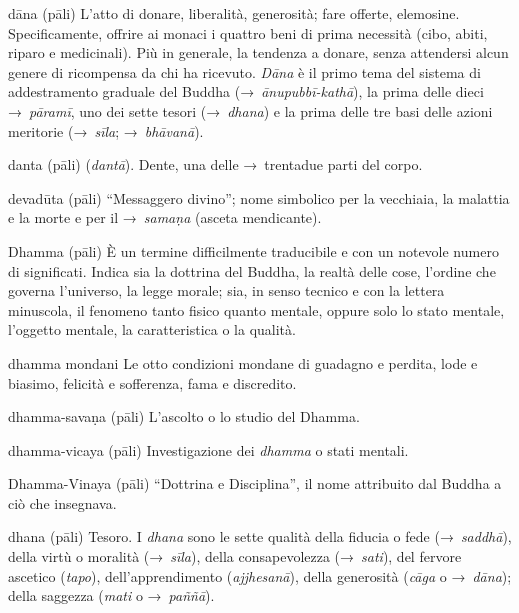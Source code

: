 \begin{glossarydescription}

\item[dāna] (pāli) L'atto di donare, liberalità, generosità; fare offerte,
  elemosine. Specificamente, offrire ai monaci i quattro beni di prima necessità
  (cibo, abiti, riparo e medicinali). Più in generale, la tendenza a donare,
  senza attendersi alcun genere di ricompensa da chi ha ricevuto. \emph{Dāna} è
  il primo tema del sistema di addestramento graduale del Buddha
  (→~\emph{ānupubbī-kathā}), la prima delle dieci →~\emph{pāramī}, uno dei sette
  tesori (→~\emph{dhana}) e la prima delle tre basi delle azioni meritorie
  (→~\emph{sīla}; →~\emph{bhāvanā}).

\item[danta] (pāli) (\emph{dantā}). Dente, una delle →~trentadue parti del
  corpo.

\item[devadūta] (pāli) ``Messaggero divino''; nome simbolico per la vecchiaia,
  la malattia e la morte e per il →~\emph{samaṇa} (asceta mendicante).

\item[Dhamma] (pāli)\label{glossary-dhamma} È un termine difficilmente traducibile e con un notevole
  numero di significati. Indica sia la dottrina del Buddha, la realtà delle
  cose, l'ordine che governa l'universo, la legge morale; sia, in senso tecnico
  e con la lettera minuscola, il fenomeno tanto fisico quanto mentale, oppure
  solo lo stato mentale, l'oggetto mentale, la caratteristica o la qualità.

\item[dhamma mondani] Le otto condizioni mondane di guadagno e perdita, lode e
  biasimo, felicità e sofferenza, fama e discredito.

\item[dhamma-savaṇa] (pāli) L'ascolto o lo studio del Dhamma.

\item[dhamma-vicaya] (pāli) Investigazione dei \emph{dhamma} o stati mentali.

\item[Dhamma-Vinaya] (pāli) ``Dottrina e Disciplina'', il nome attribuito dal
  Buddha a ciò che insegnava.

\item[dhana] (pāli) Tesoro. I \emph{dhana} sono le sette qualità della fiducia o
  fede (→~\emph{saddhā}), della virtù o moralità (→~\emph{sīla}), della
  consapevolezza (→~\emph{sati}), del fervore ascetico (\emph{tapo}),
  dell'apprendimento (\emph{ajjhesanā}), della generosità (\emph{cāga} o
  →~\emph{dāna}); della saggezza (\emph{mati} o →~\emph{paññā}).


\end{glossarydescription}
